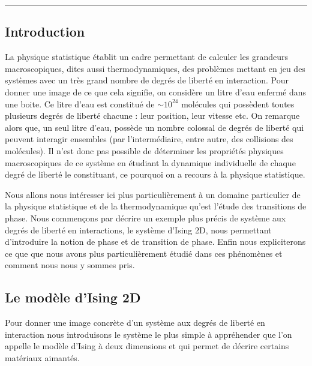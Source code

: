 \documentclass[10.5pt]{article}
\begin{document}
\begin{center}
\rule{13.7cm}{.5pt}
\end{center}

\pagebreak 

\tableofcontents

\pagebreak
\begin{multicols*}{2}

\section{Introduction}


La physique statistique établit un cadre permettant de calculer les grandeurs macroscopiques, dites aussi thermodynamiques, des problèmes mettant en jeu des systèmes avec un très grand nombre de degrés de liberté en interaction. Pour donner une image de ce que cela signifie, on considère un litre d'eau enfermé dans une boite. Ce litre d'eau est constitué de $\sim 10^{24}$ molécules qui possèdent toutes plusieurs degrés de liberté chacune : leur position, leur vitesse etc. On remarque alors que, un seul litre d'eau, possède un nombre colossal de degrés de liberté qui peuvent interagir ensembles (par l'intermédiaire, entre autre, des collisions des molécules). Il n'est donc pas possible de déterminer les propriétés physiques macroscopiques de ce système en étudiant la dynamique individuelle de chaque degré de liberté le constituant, ce pourquoi on a recours à la physique statistique. 

Nous allons nous intéresser ici plus particulièrement à un domaine particulier de la physique statistique et de la thermodynamique qu'est l'étude des transitions de phase. Nous commençons par décrire un exemple plus précis de système aux degrés de liberté en interactions, le système d'Ising 2D, nous permettant d'introduire la notion de phase et de transition de phase. Enfin nous expliciterons ce que que nous avons plus particulièrement étudié dans ces phénomènes et comment nous nous y sommes pris. \\




\subsection{Le modèle d'Ising 2D}


\label{sec:IsingIntro}

Pour donner une image concrète d'un système aux degrés de liberté en interaction nous introduisons le système le plus simple à appréhender que l'on appelle le modèle d'Ising à deux dimensions et qui permet de décrire certains matériaux aimantés. \\


\end{multicols*}
\end{document}
